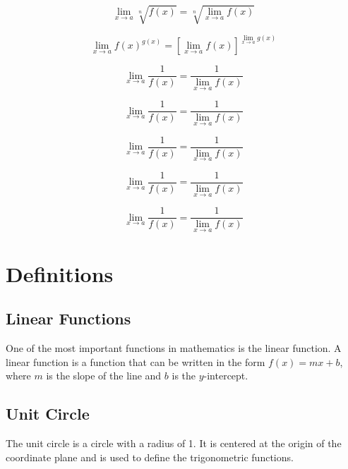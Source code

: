 \documentclass{book}
\begin{document}
\begin{equation}
    \lim_{x \to a} \sqrt[n]{f(x)} = \sqrt[n]{\lim_{x \to a} f(x)}
\end{equation}

\begin{equation}
    \lim_{x \to a} f(x)^{g(x)} = \left[\lim_{x \to a} f(x)\right]^{\lim_{x \to a} g(x)}
\end{equation}

\begin{equation}
    \lim_{x \to a} \frac{1}{f(x)} = \frac{1}{\lim_{x \to a} f(x)}
\end{equation}

\begin{equation}
    \lim_{x \to a} \frac{1}{f(x)} = \frac{1}{\lim_{x \to a} f(x)}
\end{equation}

\begin{equation}
    \lim_{x \to a} \frac{1}{f(x)} = \frac{1}{\lim_{x \to a} f(x)}
\end{equation}

\begin{equation}
    \lim_{x \to a} \frac{1}{f(x)} = \frac{1}{\lim_{x \to a} f(x)}
\end{equation}

\begin{equation}
    \lim_{x \to a} \frac{1}{f(x)} = \frac{1}{\lim_{x \to a} f(x)}
\end{equation}

\chapter{Definitions}
\section{Linear Functions}
One of the most important functions in mathematics is the linear function. A linear function is a function that can be written in the form $f(x) = mx + b$, where $m$ is the slope of the line and $b$ is the $y$-intercept.

\section{Unit Circle}
The unit circle is a circle with a radius of 1. It is centered at the origin of the coordinate plane and is used to define the trigonometric functions.
\end{document}

